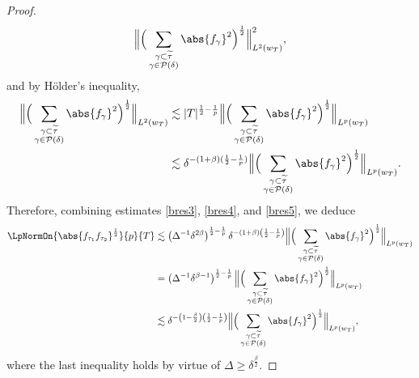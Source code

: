 \documentclass[reqno,centertags,11pt,a4paper]{amsart}
\begin{document}
\begin{proof}
\begin{equation}
     \Big\| \Big(\sum_{\substack{\gamma \subset \widetilde{\tau} \\ \gamma \in \mathcal{P}(\delta)}} \abs{f_\gamma}^2 \Big)^{\frac{1}{2}} \Big\|_{L^2(w_{T})}^2,
\end{equation}
and by H\"older's inequality,
\begin{align}\label{bres5}
  \nonumber\Big\| \Big(\sum_{\substack{\gamma \subset \widetilde{\tau} \\ \gamma \in \mathcal{P}(\delta)}} \abs{f_\gamma}^2 \Big)^{\frac{1}{2}} \Big\|_{L^2(w_{T})}&\lesssim |T|^{\frac{1}{2}-\frac{1}{p}}\Big\| \Big(\sum_{\substack{\gamma \subset \widetilde{\tau} \\ \gamma \in \mathcal{P}(\delta)}} \abs{f_\gamma}^2 \Big)^{\frac{1}{2}} \Big\|_{L^p(w_{T})}
\\&\lesssim \delta^{-(1+\beta)(\frac{1}{2}-\frac{1}{p})}\Big\| \Big(\sum_{\substack{\gamma \subset \widetilde{\tau} \\ \gamma \in \mathcal{P}(\delta)}} \abs{f_\gamma}^2 \Big)^{\frac{1}{2}} \Big\|_{L^p(w_{T})}.
\end{align}
Therefore, combining estimates \eqref{bres3}, \eqref{bres4}, and \eqref{bres5}, we deduce
\begin{align}\label{bres6}
\nonumber
\LpNormOn{\abs{f_{\tau_1}f_{\tau_2}}^{\frac{1}{2}}}{p}{{T}}
\nonumber
&\lesssim \left(\Delta^{-1}\delta^{2\beta}\right)^{\frac{1}{2} - \frac{1}{p}} \delta^{-(1+\beta)\left(\frac{1}{2} - \frac{1}{p}\right)}
  \Big\| \Big(\sum_{\substack{\gamma \subset \widetilde{\tau} \\ \gamma \in \mathcal{P}(\delta)}} \abs{f_\gamma}^2 \Big)^{\frac{1}{2}} \Big\|_{L^p(w_{T})} \\
\nonumber
&= \left(\Delta^{-1}\delta^{\beta - 1}\right)^{\frac{1}{2} - \frac{1}{p}}
  \Big\| \Big(\sum_{\substack{\gamma \subset \widetilde{\tau} \\ \gamma \in \mathcal{P}(\delta)}} \abs{f_\gamma}^2 \Big)^{\frac{1}{2}} \Big\|_{L^p(w_{T})} \\
&\lesssim  \delta^{-\left(1 - \frac{\beta}{2}\right)\left(\frac{1}{2} - \frac{1}{p}\right)}
  \Big\| \Big(\sum_{\substack{\gamma \subset \widetilde{\tau} \\ \gamma \in \mathcal{P}(\delta)}} \abs{f_\gamma}^2 \Big)^{\frac{1}{2}} \Big\|_{L^p(w_{T})},
\end{align}
where the last inequality holds by virtue of $\Delta \ge \delta^{\frac{\beta}{2}}$.



\end{proof}
\end{document}
